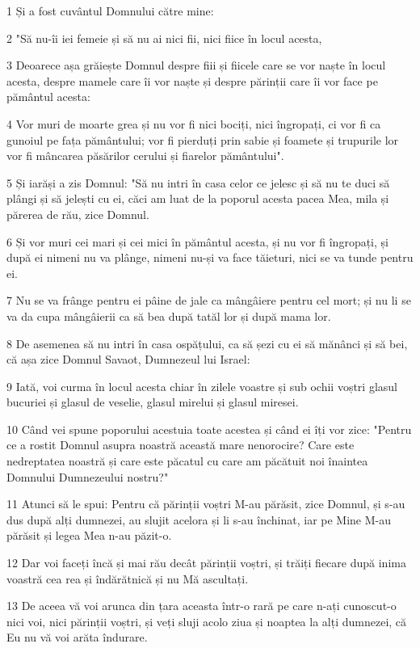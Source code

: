 \par 1 Și a fost cuvântul Domnului către mine:
\par 2 "Să nu-îi iei femeie și să nu ai nici fii, nici fiice în locul acesta,
\par 3 Deoarece așa grăiește Domnul despre fiii și fiicele care se vor naște în locul acesta, despre mamele care îi vor naște și despre părinții care îi vor face pe pământul acesta:
\par 4 Vor muri de moarte grea și nu vor fi nici bociți, nici îngropați, ci vor fi ca gunoiul pe fața pământului; vor fi pierduți prin sabie și foamete și trupurile lor vor fi mâncarea păsărilor cerului și fiarelor pământului".
\par 5 Și iarăși a zis Domnul: "Să nu intri în casa celor ce jelesc și să nu te duci să plângi și să jelești cu ei, căci am luat de la poporul acesta pacea Mea, mila și părerea de rău, zice Domnul.
\par 6 Și vor muri cei mari și cei mici în pământul acesta, și nu vor fi îngropați, și după ei nimeni nu va plânge, nimeni nu-și va face tăieturi, nici se va tunde pentru ei.
\par 7 Nu se va frânge pentru ei pâine de jale ca mângâiere pentru cel mort; și nu li se va da cupa mângâierii ca să bea după tatăl lor și după mama lor.
\par 8 De asemenea să nu intri în casa ospățului, ca să șezi cu ei să mănânci și să bei, că așa zice Domnul Savaot, Dumnezeul lui Israel:
\par 9 Iată, voi curma în locul acesta chiar în zilele voastre și sub ochii voștri glasul bucuriei și glasul de veselie, glasul mirelui și glasul miresei.
\par 10 Când vei spune poporului acestuia toate acestea și când ei îți vor zice: "Pentru ce a rostit Domnul asupra noastră această mare nenorocire? Care este nedreptatea noastră și care este păcatul cu care am păcătuit noi înaintea Domnului Dumnezeului nostru?"
\par 11 Atunci să le spui: Pentru că părinții voștri M-au părăsit, zice Domnul, și s-au dus după alți dumnezei, au slujit acelora și li s-au închinat, iar pe Mine M-au părăsit și legea Mea n-au păzit-o.
\par 12 Dar voi faceți încă și mai rău decât părinții voștri, și trăiți fiecare după inima voastră cea rea și îndărătnică și nu Mă ascultați.
\par 13 De aceea vă voi arunca din țara aceasta într-o rară pe care n-ați cunoscut-o nici voi, nici părinții voștri, și veți sluji acolo ziua și noaptea la alți dumnezei, că Eu nu vă voi arăta îndurare.
